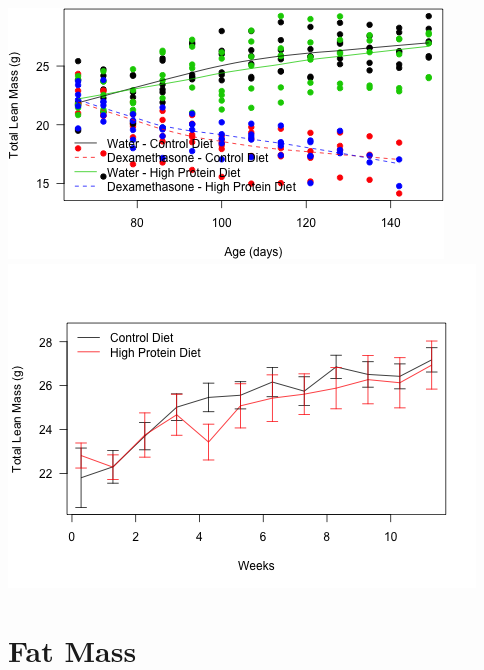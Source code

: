 \documentclass[]{article}
\begin{document}
\includegraphics{figures/lean-mass-scatterplot-1.png}
\includegraphics{figures/lean-mass-scatterplot-2.png}

\section{Fat Mass}\label{fat-mass}
\end{document}
